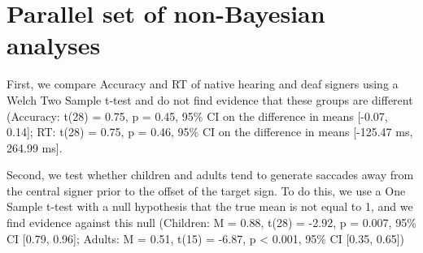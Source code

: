 \documentclass[oneside]{report}
\begin{document}
\hypertarget{parallel-set-of-non-bayesian-analyses}{%
\section{Parallel set of non-Bayesian
analyses}\label{parallel-set-of-non-bayesian-analyses}}

First, we compare Accuracy and RT of native hearing and deaf signers
using a Welch Two Sample t-test and do not find evidence that these
groups are different (Accuracy: t(28) = 0.75, p = 0.45, 95\% CI on the
difference in means {[}-0.07, 0.14{]}; RT: t(28) = 0.75, p = 0.46, 95\%
CI on the difference in means {[}-125.47 ms, 264.99 ms{]}.

Second, we test whether children and adults tend to generate saccades
away from the central signer prior to the offset of the target sign. To
do this, we use a One Sample t-test with a null hypothesis that the true
mean is not equal to 1, and we find evidence against this null
(Children: M = 0.88, t(28) = -2.92, p = 0.007, 95\% CI {[}0.79, 0.96{]};
Adults: M = 0.51, t(15) = -6.87, p \textless{} 0.001, 95\% CI {[}0.35,
0.65{]})
\end{document}

